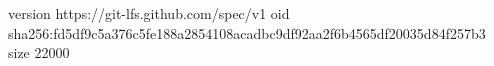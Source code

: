 version https://git-lfs.github.com/spec/v1
oid sha256:fd5df9c5a376c5fe188a2854108acadbc9df92aa2f6b4565df20035d84f257b3
size 22000
